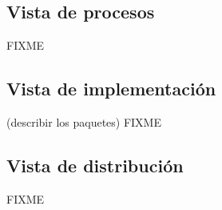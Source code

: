 \subsection{Vista de procesos}

FIXME

\subsection{Vista de implementación}

(describir los paquetes) FIXME

\subsection{Vista de distribución}

FIXME


